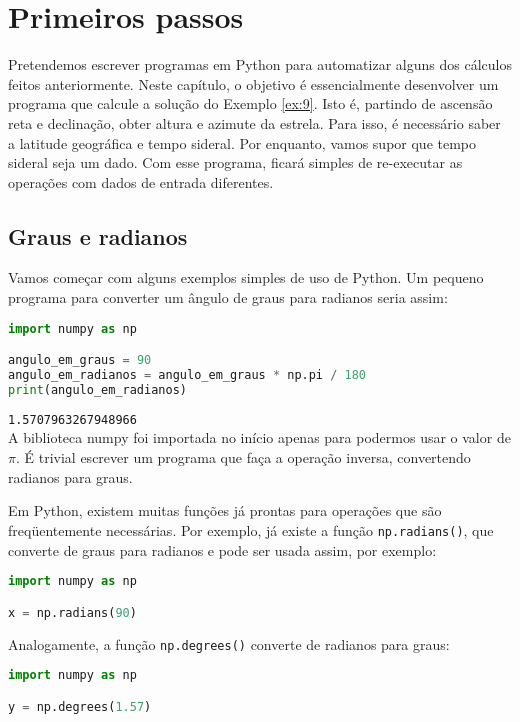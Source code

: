 \chapter{Primeiros passos}

Pretendemos escrever programas em Python para automatizar alguns dos cálculos feitos anteriormente. Neste capítulo, o objetivo é essencialmente desenvolver um programa que calcule a solução do Exemplo \ref{ex:9}. Isto é, partindo de ascensão reta e declinação, obter altura e azimute da estrela. Para isso, é necessário saber a latitude geográfica e tempo sideral. Por enquanto, vamos supor que tempo sideral seja um dado. Com esse programa, ficará simples de re-executar as operações com dados de entrada diferentes.

\section{Graus e radianos}

Vamos começar com alguns exemplos simples de uso de Python. Um pequeno programa para converter um ângulo de graus para radianos seria assim:

\begin{lstlisting}[language=Python]
import numpy as np

angulo_em_graus = 90
angulo_em_radianos = angulo_em_graus * np.pi / 180
print(angulo_em_radianos)
\end{lstlisting}

\noindent\texttt{1.5707963267948966}\\

\noindent A biblioteca numpy foi importada no início apenas para podermos usar o valor de $\pi$. É trivial escrever um programa que faça a operação inversa, convertendo radianos para graus.

Em Python, existem muitas funções já prontas para operações que são freqüentemente necessárias. Por exemplo, já existe a função \texttt{np.radians()}, que converte de graus para radianos e pode ser usada assim, por exemplo:

\begin{lstlisting}[language=Python]
import numpy as np

x = np.radians(90)
\end{lstlisting}

\noindent Analogamente, a função \texttt{np.degrees()} converte de radianos para graus:

\begin{lstlisting}[language=Python]
import numpy as np

y = np.degrees(1.57)
\end{lstlisting}


